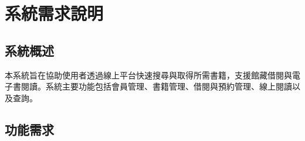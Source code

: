 \chapter{系統需求說明}

\section{系統概述}

\hspace*{2em}本系統旨在協助使用者透過線上平台快速搜尋與取得所需書籍，支援館藏借閱與電子書閱讀。系統主要功能包括會員管理、書籍管理、借閱與預約管理、線上閱讀以及查詢。

\section{功能需求}

